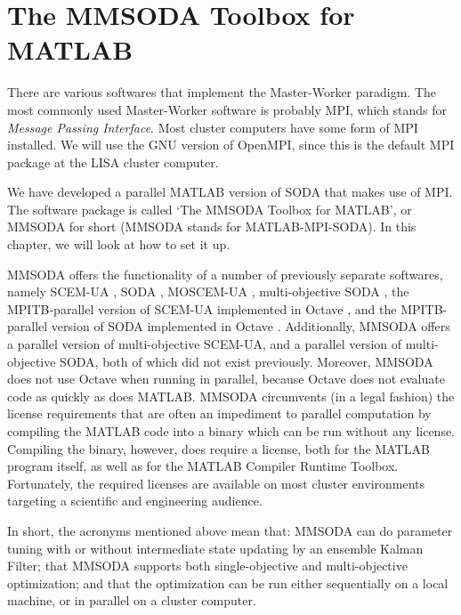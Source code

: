 \chapter{The MMSODA Toolbox for MATLAB}
\label{ch:mmsoda}

There are various softwares that implement the Master-Worker paradigm. The most commonly used Master-Worker software is probably MPI, which stands for \textit{Message Passing Interface}. Most cluster computers have some form of MPI installed. We will use the GNU version of OpenMPI, since this is the default MPI package at the LISA cluster computer.

We have developed a parallel MATLAB version of SODA \citep[e.g.][]{vrug-diks-gupt-bout-vers-2005} that makes use of MPI. The software package is called `The MMSODA Toolbox for MATLAB', or MMSODA for short (MMSODA stands for MATLAB-MPI-SODA). In this chapter, we will look at how to set it up.

MMSODA offers the functionality of a number of previously separate softwares, namely SCEM-UA \citep{vrug-gupt-bout-soro-2003}, SODA \citep{vrug-diks-gupt-bout-vers-2005,vrug-robi-vess-2005,clar-vrug-2006}, MOSCEM-UA \citep{vrug-gupt-bast-bout-soro-2003}, multi-objective SODA \citep{vrug-stau-wohl-robi-vess-2008}, the MPITB-parallel version of SCEM-UA implemented in Octave \citep{vrug-onua-robi-bout-dekk-sloo-2006}, and the MPITB-parallel version of SODA implemented in Octave \citep{vrug-gupt-onua-bout-2006}. Additionally, MMSODA offers a parallel version of multi-objective SCEM-UA, and a parallel version of multi-objective SODA, both of which did not exist previously. Moreover, MMSODA does not use Octave when running in parallel, because Octave does not evaluate code as quickly as does MATLAB. MMSODA circumvents (in a legal fashion) the license requirements that are often an impediment to parallel computation by compiling the MATLAB code into a binary which can be run without any license. Compiling the binary, however, does require a license, both for the MATLAB program itself, as well as for the MATLAB Compiler Runtime Toolbox. Fortunately, the required licenses are available on most cluster environments targeting a scientific and engineering audience.

In short, the acronyms mentioned above mean that: MMSODA can do parameter tuning with or without intermediate state updating by an ensemble Kalman Filter; that MMSODA supports both single-objective and multi-objective optimization; and that the optimization can be run either sequentially on a local machine, or in parallel on a cluster computer.

